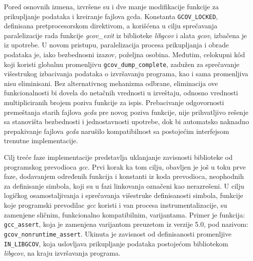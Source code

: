 \documentclass[12pt,oneside]{memoir}
\newcommand{\kod}[1]{\texttt{#1}}
\newcommand{\strano}[1]{\textit{#1}}
\begin{document}
Pored osnovnih izmena, izvršene su i dve manje modifikacije funkcije za prikupljanje podataka i kreiranje fajlova gcda. Konstanta \kod{GCOV\_LOCKED}, definisana pretprocesorskom direktivom, a korišćena u cilju sprečavanja paralelizacije rada funkcije \strano{gcov\_exit} iz biblioteke \strano{libgcov} i alata \strano{gcov}, izbačena je iz upotrebe. U novom pristupu, paralelizacija procesa prikupljanja i obrade podataka je, iako bezbednosni izazov, poželjna osobina. Međutim, celokupni k\^{o}d koji koristi globalnu promenljivu \kod{gcov\_dump\_complete}, zadužen za sprečavanje višestrukog izbacivanja podataka o izvršavanju programa, kao i sama promenljiva nisu eliminisani. Bez alternativnog mehanizma odbrane, eliminacija ove funkcionalnosti bi dovela do netačnih vrednosti u izveštaju, odnosno vrednosti multipliciranih brojem poziva funkcije za ispis. Prebacivanje odgovornosti premeštanja starih fajlova \strano{gcda} pre novog poziva funkcije, nije prihvatljivo rešenje sa stanovišta bezbednosti i jednostavnosti upotrebe, dok bi automatsko naknadno prepakivanje fajlova \strano{gcda} narušilo kompatibilnost sa postojećim interfejsom trenutne implementacije. 

Cilj treće faze implementacije predstavlja uklanjanje zavisnosti biblioteke od programskog prevodioca \strano{gcc}. Prvi korak ka tom cilju, obavljen je još u toku prve faze, dodavanjem određenih funkcija i konstanti iz koda prevodioca, neophodnih za definisanje simbola, koji su u fazi linkovanja označeni kao nerazrešeni. U cilju logičkog osamostaljivanja i sprečavanja višestruke definisanosti simbola, funkcije koje programski prevodilac \strano{gcc} koristi i van procesa instrumentalizacije, su zamenjene sličnim, funkcionalno kompatibilnim, varijantama. Primer je funkcija: \kod{gcc\_assert}, koja je zamenjena varijantom preuzetom iz verzije 5.0, pod nazivom: \kod{gcov\_nonruntime\_assert}. Ukinuta je zavisnost od definisanosti promenljive \kod{IN\_LIBGCOV}, koja uslovljava prikupljanje podataka postojećom bibliotekom \strano{libgcov}, na kraju izvršavanja programa. 
\end{document}

